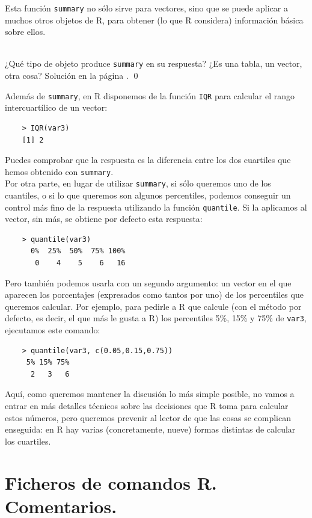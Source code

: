 \documentclass[10pt,a4paper]{article}\usepackage[]{graphicx}\usepackage[]{color}
\newcounter {cont01}
\begin{document}
Esta función {\tt summary} no sólo sirve para vectores, sino que se puede aplicar a muchos otros objetos de R, para obtener (lo que R considera) información básica sobre ellos.

\begin{ejercicio}
\label{tut02:ejercicio18}
\quad\\
¿Qué tipo de objeto produce {\tt summary} en su respuesta? ¿Es una tabla, un vector, otra cosa? Solución en la página \pageref{tut02:ejercicio18:sol}.
\qed
\end{ejercicio}

Además de {\tt summary}, en R disponemos de la función {\tt IQR} para calcular el rango intercuartílico de un vector:
\begin{verbatim}
    > IQR(var3)
    [1] 2
\end{verbatim}
Puedes comprobar que la respuesta es la diferencia entre los dos cuartiles que hemos obtenido con {\tt summary}.\\

Por otra parte, en lugar de utilizar {\tt summary}, si sólo queremos uno de los cuantiles, o si lo que queremos son algunos percentiles, podemos conseguir un control más fino de la respuesta utilizando la función {\tt quantile}. Si la aplicamos al vector, sin más, se obtiene por defecto esta respuesta:
\begin{verbatim}
    > quantile(var3)
      0%  25%  50%  75% 100%
       0    4    5    6   16
\end{verbatim}
Pero también podemos usarla con un segundo argumento: un vector en el que aparecen los porcentajes (expresados como tantos por uno) de los percentiles que queremos calcular. Por ejemplo, para pedirle a R que calcule (con el método por defecto, es decir, el que más le gusta a R) los percentiles 5\%, 15\% y 75\% de {\tt var3}, ejecutamos este comando:
\begin{verbatim}
    > quantile(var3, c(0.05,0.15,0.75))
     5% 15% 75%
      2   3   6
\end{verbatim}
Aquí, como queremos mantener la discusión lo más simple posible, no vamos a entrar en más detalles técnicos sobre las decisiones que R toma para calcular estos números, pero queremos prevenir al lector de que las cosas se complican enseguida: en R hay varias (concretamente, nueve) formas distintas de calcular los cuartiles.


\section{Ficheros de comandos R. Comentarios.}
\label{tut02:sec:FicherosComandosComentarios}
\end{document}
